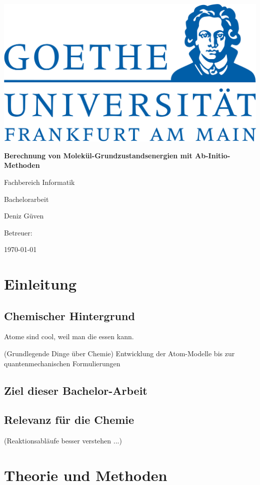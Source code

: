 \documentclass[a4paper, 12pt]{report}
\author{Deniz Güven}
\begin{document}
\begin{titlepage}
  \begin{center}
    \includegraphics[width=0.5\linewidth]{res/uni.png}
    \vspace{2cm}

    \huge{\textbf{Berechnung von Molekül-Grundzustandsenergien mit Ab-Initio-Methoden}}
    \vspace{1cm}

    \Large
    Fachbereich Informatik

    Bachelorarbeit

    Deniz Güven
    \vfill

    Betreuer: 

    \today
  \end{center}
\end{titlepage}

\tableofcontents

\chapter{Einleitung}
\section{Chemischer Hintergrund}

Atome sind cool\cite{structure_2013}, weil man die essen kann.

(Grundlegende Dinge über Chemie)
Entwicklung der Atom-Modelle bis zur quantenmechanischen Formulierungen
\section{Ziel dieser Bachelor-Arbeit}
\section{Relevanz für die Chemie}
(Reaktionsabläufe besser verstehen ...)



\chapter{Theorie und Methoden}
\end{document}
